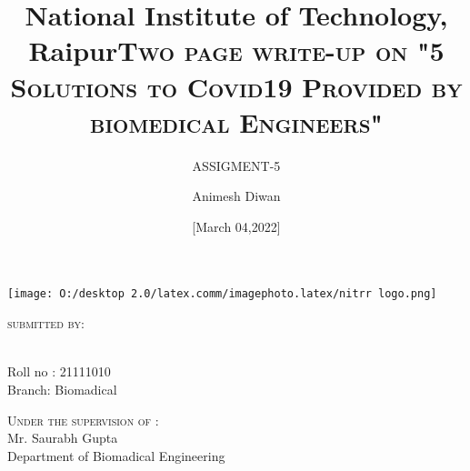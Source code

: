 \documentclass[12pt]{article}
\begin{document}
\title{National Institute of Technology, Raipur}



\author{ASSIGMENT-5}


\date{[March 04,2022]}





\maketitle
\centering
\title{\textsc{\large    Two page write-up on "5 Solutions to Covid19 Provided by biomedical Engineers"} }


\texttt{[image: O:/desktop 2.0/latex.comm/imagephoto.latex/nitrr logo.png]}
\centering

\begin{flushleft}	
\textsc{\large submitted by:}\\   
\author{Animesh Diwan}\\
[0.2cm]
Roll no : 21111010\\
[0.2cm]
Branch: Biomadical\\
[0.4cm]
\end{flushleft}       
\begin{flushright}
\textsc{\large Under the supervision of :}\\
Mr. Saurabh Gupta \\
Department of Biomadical Engineering\\
\end{flushright}


\newpage


\tableofcontents

\pagebreak 
\end{document}
